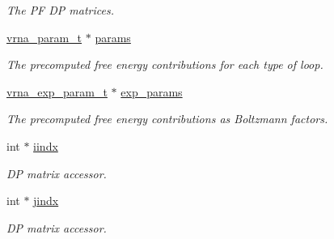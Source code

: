 \begin{Indent}
\begin{DoxyCompactItemize}
\begin{DoxyCompactList}\small\item\em The PF DP matrices. \end{DoxyCompactList}\item 
\mbox{\label{group__fold__compound_a19b8720c2c5321c1b97c830bd17566ea}} 
\hyperlink{group__energy__parameters_ga8a69ca7d787e4fd6079914f5343a1f35}{vrna\+\_\+param\+\_\+t} $\ast$ \hyperlink{group__fold__compound_a19b8720c2c5321c1b97c830bd17566ea}{params}
\begin{DoxyCompactList}\small\item\em The precomputed free energy contributions for each type of loop. \end{DoxyCompactList}\item 
\mbox{\label{group__fold__compound_a7052a5d24f6091b9c5f79edcc9456a12}} 
\hyperlink{group__energy__parameters_ga01d8b92fe734df8d79a6169482c7d8d8}{vrna\+\_\+exp\+\_\+param\+\_\+t} $\ast$ \hyperlink{group__fold__compound_a7052a5d24f6091b9c5f79edcc9456a12}{exp\+\_\+params}
\begin{DoxyCompactList}\small\item\em The precomputed free energy contributions as Boltzmann factors. \end{DoxyCompactList}\item 
\mbox{\label{group__fold__compound_afdead4cf55c882d3497e779573e17e03}} 
int $\ast$ \hyperlink{group__fold__compound_afdead4cf55c882d3497e779573e17e03}{iindx}
\begin{DoxyCompactList}\small\item\em DP matrix accessor. \end{DoxyCompactList}\item 
\mbox{\label{group__fold__compound_a5037235dee512efd85ca543780bbca1a}} 
int $\ast$ \hyperlink{group__fold__compound_a5037235dee512efd85ca543780bbca1a}{jindx}
\begin{DoxyCompactList}\small\item\em DP matrix accessor. \end{DoxyCompactList}\end{DoxyCompactItemize}
\end{Indent}
